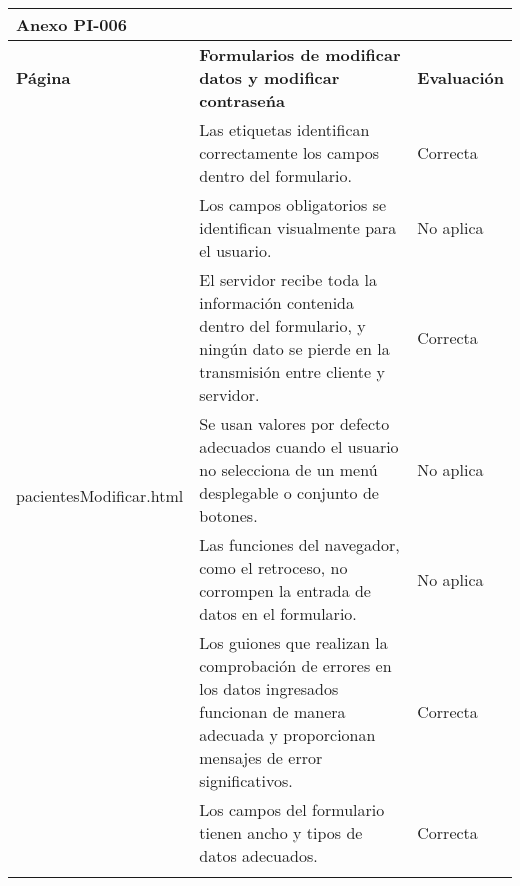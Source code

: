 \begin{table}[htpb]
\centering
\begin{tabularx}{\textwidth}{|l|X|l|}
\hline
\multicolumn{3}{|l|}{\textbf{Anexo PI-006}}                                                                                                                                                                                  \\ \hline
\textbf{Página}                           & \textbf{Formularios de modificar datos y modificar contraseńa}                                                                                            & \textbf{Evaluación} \\ \hline
\multirow{10}{*}{pacientesModificar.html} & Las etiquetas identifican correctamente los campos dentro del formulario.                                                                                 & Correcta            \\ \cline{2-3} 
                                          & Los campos obligatorios se identifican visualmente para el usuario.                                                                                       & No aplica           \\ \cline{2-3} 
                                          & El servidor recibe toda la información contenida dentro del formulario, y ningún dato se pierde en la transmisión entre cliente y servidor.               & Correcta            \\ \cline{2-3} 
                                          & Se usan valores por defecto adecuados cuando el usuario no selecciona de un menú desplegable o conjunto de botones.                                       & No aplica           \\ \cline{2-3} 
                                          & Las funciones del navegador, como el retroceso, no corrompen la entrada de datos en el formulario.                                                        & No aplica           \\ \cline{2-3} 
                                          & Los guiones que realizan la comprobación de errores en los datos ingresados funcionan de manera adecuada y proporcionan mensajes de error significativos. & Correcta            \\ \cline{2-3} 
                                          & Los campos del formulario tienen ancho y tipos de datos adecuados.                                                                                        & Correcta            \\ \cline{2-3} 

\end{tabularx}
\end{table}
